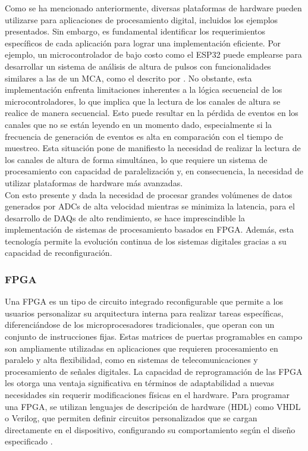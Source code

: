 \documentclass[]{book}
\begin{document}
\noindent Como se ha mencionado anteriormente, diversas plataformas de hardware pueden utilizarse para aplicaciones de procesamiento digital, incluidos los ejemplos presentados. Sin embargo, es fundamental identificar los requerimientos específicos de cada aplicación para lograr una implementación eficiente. Por ejemplo, un microcontrolador de bajo costo como el ESP32 puede emplearse para desarrollar un sistema de análisis de altura de pulsos con funcionalidades similares a las de un MCA, como el descrito por \cite{ramirez2024}. No obstante, esta implementación enfrenta limitaciones inherentes a la lógica secuencial de los microcontroladores, lo que implica que la lectura de los canales de altura se realice de manera secuencial. Esto puede resultar en la pérdida de eventos en los canales que no se están leyendo en un momento dado, especialmente si la frecuencia de generación de eventos es alta en comparación con el tiempo de muestreo. Esta situación pone de manifiesto la necesidad de realizar la lectura de los canales de altura de forma simultánea, lo que requiere un sistema de procesamiento con capacidad de paralelización y, en consecuencia, la necesidad de utilizar plataformas de hardware más avanzadas.\\

\noindent Con esto presente y dada la necesidad de procesar grandes volúmenes de datos generados por ADCs de alta velocidad mientras se minimiza la latencia, para el desarrollo de DAQs de alto rendimiento, se hace imprescindible la implementación de sistemas de procesamiento basados en FPGA. Además, esta tecnología permite la evolución continua de los sistemas digitales gracias a su capacidad de reconfiguración.

\subsubsection{FPGA}
\noindent Una FPGA es un tipo de circuito integrado reconfigurable que permite a los usuarios personalizar su arquitectura interna para realizar tareas específicas, diferenciándose de los microprocesadores tradicionales, que operan con un conjunto de instrucciones fijas. Estas matrices de puertas programables en campo son ampliamente utilizadas en aplicaciones que requieren procesamiento en paralelo y alta flexibilidad, como en sistemas de telecomunicaciones y procesamiento de señales digitales. La capacidad de reprogramación de las FPGA les otorga una ventaja significativa en términos de adaptabilidad a nuevas necesidades sin requerir modificaciones físicas en el hardware. Para programar una FPGA, se utilizan lenguajes de descripción de hardware (HDL) como VHDL o Verilog, que permiten definir circuitos personalizados que se cargan directamente en el dispositivo, configurando su comportamiento según el diseño especificado \cite{brown2000fundamentals}.\\
\end{document}

